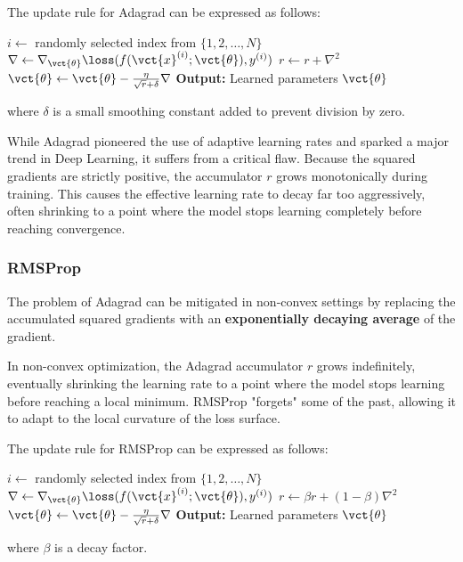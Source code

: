 The update rule for Adagrad can be expressed as follows: 
\begin{algorithm}[H] 
    \caption{Adagrad} 
    \begin{algorithmic}[1] 
            \State $i \leftarrow$ randomly selected index from $\{1, 2, \ldots, N\}$ 
            \State $\nabla \leftarrow \nabla_{\vct{\theta}} \loss(f(\vct{x}^{(i)}; \vct{\theta}), y^{(i)})$ 
            \State $r \leftarrow r + \nabla^2$ 
            \State $\vct{\theta} \leftarrow \vct{\theta} - \frac{\eta}{\sqrt{r} + \delta} \nabla$ 
        \EndWhile 
        \State \textbf{Output:} Learned parameters $\vct{\theta}$ 
    \end{algorithmic} 
\end{algorithm} 
where $\delta$ is a small smoothing constant added to prevent division by zero. 

While Adagrad pioneered the use of adaptive learning rates and sparked a major trend in Deep Learning, it suffers from a critical flaw. 
Because the squared gradients are strictly positive, the accumulator $r$ grows monotonically during training. 
This causes the effective learning rate to decay far too aggressively, often shrinking to a point where the model stops learning completely before reaching convergence.

\subsubsection*{RMSProp}
The problem of Adagrad can be mitigated in non-convex settings by replacing the accumulated squared gradients with 
an \textbf{exponentially decaying average} of the gradient.

In non-convex optimization, the Adagrad accumulator $r$ grows indefinitely, eventually shrinking the learning rate to a point 
where the model stops learning before reaching a local minimum. RMSProp "forgets" some of the past, allowing it to adapt 
to the local curvature of the loss surface.

The update rule for RMSProp can be expressed as follows:
\begin{algorithm}[H]
    \caption{RMSProp}
    \begin{algorithmic}[1]
            \State $i \leftarrow$ randomly selected index from $\{1, 2, \ldots, N\}$
            \State $\nabla \leftarrow \nabla_{\vct{\theta}} \loss(f(\vct{x}^{(i)}; \vct{\theta}), y^{(i)})$
            \State $r \leftarrow \beta r + (1 - \beta) \nabla^2$
            \State $\vct{\theta} \leftarrow \vct{\theta} - \frac{\eta}{\sqrt{r} + \delta} \nabla$
        \EndWhile
        \State \textbf{Output:} Learned parameters $\vct{\theta}$
    \end{algorithmic}
\end{algorithm}
where $\beta$ is a decay factor.

